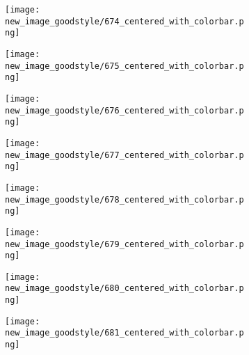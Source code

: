 \documentclass[a4paper,12pt]{article}
\begin{document}
\begin{figure}[H]
  \begin{subfigure}{0.11\textwidth}
    \texttt{[image: new\_image\_goodstyle/674\_centered\_with\_colorbar.png]}
  \end{subfigure}
  \hfill
  \begin{subfigure}{0.11\textwidth}
    \texttt{[image: new\_image\_goodstyle/675\_centered\_with\_colorbar.png]}
  \end{subfigure}
  \hfill
  \begin{subfigure}{0.11\textwidth}
    \texttt{[image: new\_image\_goodstyle/676\_centered\_with\_colorbar.png]}
  \end{subfigure}
  \hfill
  \begin{subfigure}{0.11\textwidth}
    \texttt{[image: new\_image\_goodstyle/677\_centered\_with\_colorbar.png]}
  \end{subfigure}
  \hfill
  \begin{subfigure}{0.11\textwidth}
    \texttt{[image: new\_image\_goodstyle/678\_centered\_with\_colorbar.png]}
  \end{subfigure}
  \hfill
  \begin{subfigure}{0.11\textwidth}
    \texttt{[image: new\_image\_goodstyle/679\_centered\_with\_colorbar.png]}
  \end{subfigure}
  \hfill
  \begin{subfigure}{0.11\textwidth}
    \texttt{[image: new\_image\_goodstyle/680\_centered\_with\_colorbar.png]}
  \end{subfigure}
  \hfill
  \begin{subfigure}{0.11\textwidth}
    \texttt{[image: new\_image\_goodstyle/681\_centered\_with\_colorbar.png]}
  \end{subfigure}
  \hfill
\end{figure}
\end{document}
